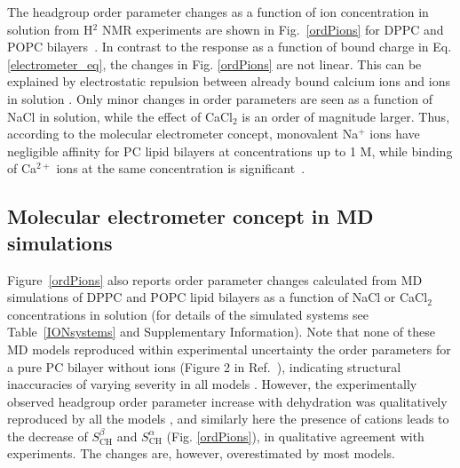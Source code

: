 \documentclass[pre,aps,floatfix,authordate1-4,twocolumn]{revtex4-1}
\begin{document}

The headgroup order parameter changes as a function of ion concentration in
solution from H$^2$ NMR experiments are shown in Fig.~\ref{ordPions} for DPPC and POPC bilayers~\cite{akutsu81,altenbach84}.
In contrast to the response as a function of bound charge in 
Eq. \ref{electrometer_eq}, the changes in Fig. \ref{ordPions}
are not linear. This can be explained by electrostatic repulsion between
already bound calcium ions and ions in solution \cite{altenbach84}.
Only minor changes in order parameters are seen
as a function of NaCl in solution, 
while the effect of CaCl$_2$ is an order of magnitude larger. 
Thus, according to the molecular electrometer concept, 
monovalent Na$^+$ ions have negligible affinity for PC lipid bilayers at concentrations up to 1 M,
while binding of Ca$^{2+}$ ions at the same concentration is significant~\cite{akutsu81,altenbach84}. 

\subsection{Molecular electrometer concept in MD simulations}\label{electrometerinsimulations}

Figure~\ref{ordPions} also reports order parameter changes calculated from MD simulations
of DPPC and POPC lipid bilayers as a function of NaCl or CaCl$_2$ concentrations in solution
(for details of the simulated systems see Table~\ref{IONsystems} and Supplementary Information).
Note that none of these MD models
reproduced within experimental uncertainty the order parameters for a pure PC bilayer without ions
(Figure 2 in Ref.~\cite{botan15}),
indicating structural inaccuracies of varying severity in all models \cite{botan15}.
However, the experimentally observed headgroup order parameter increase with dehydration
was qualitatively reproduced by all the models \cite{botan15}, and 
similarly here the presence of cations leads to the decrease 
of $S_\mathrm{CH}^\beta$ and $S_\mathrm{CH}^\alpha$ (Fig. \ref{ordPions}), in qualitative
agreement with experiments. The changes are, however, overestimated by most models.
\end{document}
